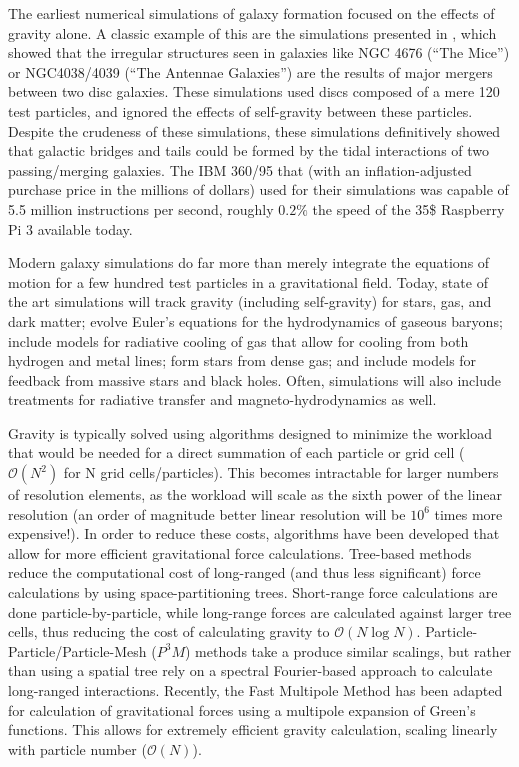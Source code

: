 The earliest numerical simulations of galaxy formation focused on the
effects of gravity alone.  A classic example of this are the simulations
presented in \citet{Toomre1972}, which showed that the irregular structures seen
in galaxies like NGC 4676 (``The Mice'') or NGC4038/4039 (``The Antennae
Galaxies'') are the results of major mergers between two disc galaxies.  These
simulations used discs composed of a mere 120 test particles, and ignored the
effects of self-gravity between these particles.  Despite the crudeness of these
simulations, these simulations definitively showed that galactic bridges and
tails could be formed by the tidal interactions of two passing/merging galaxies.
The IBM 360/95 that \citet{Toomre1972} (with an inflation-adjusted purchase
price in the millions of dollars) used for their simulations was capable of
5.5 million instructions per second, roughly $0.2\%$ the speed of the 35\$
Raspberry Pi 3 available today.

Modern galaxy simulations do far more than merely integrate the equations of
motion for a few hundred test particles in a gravitational field.  Today, state
of the art simulations will track gravity (including self-gravity) for stars,
gas, and dark matter; evolve Euler's equations for the hydrodynamics of gaseous
baryons; include models for radiative cooling of gas that allow for cooling from
both hydrogen and metal lines; form stars from dense gas; and include models for
feedback from massive stars and black holes.  Often, simulations will also
include treatments for radiative transfer and magneto-hydrodynamics as well.

Gravity is typically solved using algorithms designed to minimize the workload
that would be needed for a direct summation of each particle or grid cell
($\mathcal{O}(N^2)$ for N grid cells/particles).  This becomes intractable for
larger numbers of resolution elements, as the workload will scale as the sixth
power of the linear resolution (an order of magnitude better linear resolution
will be $10^6$ times more expensive!).  In order to reduce these costs,
algorithms have been developed that allow for more efficient gravitational
force calculations.  Tree-based methods \citep{Barnes1986} reduce the
computational cost of long-ranged (and thus less significant) force
calculations by using space-partitioning trees.  Short-range force calculations
are done particle-by-particle, while long-range forces are calculated against
larger tree cells, thus reducing the cost of calculating gravity to
$\mathcal{O}(N\log N)$.  Particle-Particle/Particle-Mesh ($P^3M$) methods
\citep{Couchman1991} take a produce similar scalings, but rather than using a
spatial tree rely on a spectral Fourier-based approach to calculate long-ranged
interactions.  Recently, the Fast Multipole Method \citep{Greengard1987} has
been adapted for calculation of gravitational forces
\citep{Dehnen2002,Hahn2013} using a multipole expansion of Green's functions.
This allows for extremely efficient gravity calculation, scaling linearly with
particle number ($\mathcal{O}(N)$).

